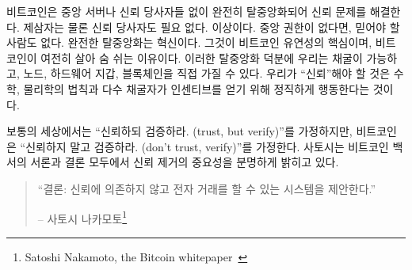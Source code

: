 \begin{comment}
	Bitcoin solves the problem of trust by being completely decentralized,
	with no central server or trusted parties. Not even trusted \textit{third}
	parties, but trusted parties, period. When there is no central
	authority, there simply \textit{is} no-one to trust. Complete decentralization
	is the innovation. It is the root of Bitcoin's resilience, the reason
	why it is still alive. Decentralization is also why we have mining,
	nodes, hardware wallets, and yes, the blockchain. The only thing you
	have to \enquote{trust} is that our understanding of mathematics and physics
	isn't totally off and that the majority of miners act honestly (which
	they are incentivized to do).
\end{comment}
비트코인은 중앙 서버나 신뢰 당사자들 없이 완전히 탈중앙화되어 신뢰 문제를 해결한다.
제삼자는 물론 신뢰 당사자도 필요 없다. 이상이다.
중앙 권한이 없다면, 믿어야 할 사람도 없다.
완전한 탈중앙화는 혁신이다. 
그것이 비트코인 유연성의 핵심이며, 비트코인이 여전히 살아 숨 쉬는 이유이다.
이러한 탈중앙화 덕분에 우리는 채굴이 가능하고, 노드, 하드웨어 지갑, 블록체인을 직접 가질 수 있다. 
우리가 \enquote{신뢰}해야 할 것은 수학, 물리학의 법칙과 
다수 채굴자가 인센티브를 얻기 위해 정직하게 행동한다는 것이다.

\begin{comment}
	While the regular world operates under the assumption of \textit{\enquote{trust,
			but verify,}} Bitcoin operates under the assumption of \textit{\enquote{don't
			trust, verify.}} Satoshi made the importance of removing trust very clear in
	both the introduction as well as the conclusion of the Bitcoin whitepaper.
\end{comment}
보통의 세상에서는 \enquote{신뢰하되 검증하라. (trust, but verify)}를 가정하지만,
비트코인은 \enquote{신뢰하지 말고 검증하라. (don't trust, verify)}를 가정한다.
사토시는 비트코인 백서의 서론과 결론 모두에서 신뢰 제거의 중요성을 분명하게 밝히고 있다.

\begin{quotation}\begin{samepage}
		\enquote{결론: 신뢰에 의존하지 않고 전자 거래를 할 수 있는 시스템을 제안한다.}
		\begin{flushright} -- 사토시 나카모토\footnote{Satoshi Nakamoto, the Bitcoin whitepaper~\cite{whitepaper}}
\end{flushright}\end{samepage}\end{quotation}

